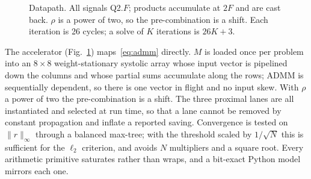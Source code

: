\documentclass[conference]{IEEEtran}
\begin{document}
\begin{figure}[t]
\centering
{}
\caption{Datapath. All signals Q2.$F$; products accumulate at $2F$ and are cast
back. $\rho$ is a power of two, so the pre-combination is a shift. Each
iteration is 26 cycles; a solve of $K$ iterations is $26K+3$.}
\label{fig:arch}
\end{figure}

The accelerator (Fig.~\ref{fig:arch}) maps~\eqref{eq:admm} directly. $M$ is
loaded once per problem into an $8\times8$ weight-stationary systolic array
whose input vector is pipelined down the columns and whose partial sums
accumulate along the rows; ADMM is sequentially dependent, so there is one
vector in flight and no input skew. With $\rho$ a power of two the
pre-combination is a shift. The three proximal lanes are all instantiated and
selected at run time, so that a lane cannot be removed by constant
propagation and inflate a reported saving. Convergence is tested on
$\lVert r\rVert_\infty$ through a balanced max-tree; with the threshold scaled
by $1/\sqrt N$ this is sufficient for the $\ell_2$ criterion, and avoids $N$
multipliers and a square root.
Every arithmetic primitive saturates rather than wraps, and a bit-exact Python
model mirrors each one.
\end{document}
